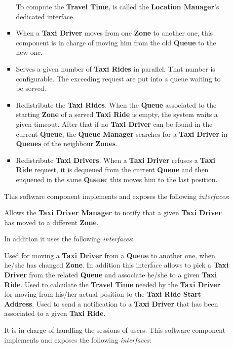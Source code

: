 \begin{itemize}
\begin{itemize}
\begin{itemize}
			To compute the \textbf{Travel Time}, is called the \textbf{Location Manager}'s dedicated interface.
			\item When a \textbf{Taxi Driver} moves from one \textbf{Zone} to another one, this component is in charge of moving him from the old \textbf{Queue} to the new one.
			\item Serves a given number of \textbf{Taxi Rides} in parallel. That number is configurable. The exceeding request are put into a queue waiting to be served.
			\item Redistribute the \textbf{Taxi Rides}. When the \textbf{Queue} associated to the starting \textbf{Zone} of a served \textbf{Taxi Ride} is empty, the system waits a given timeout. After that if no \textbf{Taxi Driver} can be found in the current \textbf{Queue}, the \textbf{Queue Manager} searches for a \textbf{Taxi Driver} in \textbf{Queues} of the neighbour \textbf{Zones}.
			\item Redistribute \textbf{Taxi Drivers}. When a \textbf{Taxi Driver} refuses a \textbf{Taxi Ride} request, it is dequeued from the current \textbf{Queue} and then enqueued in the same \textbf{Queue}: this moves him to the last position.
		\end{itemize}
		This software component implements and exposes the following \textit{interfaces}:
		\begin{itemize}
			 Allows the \textbf{Taxi Driver Manager} to notify that a given \textbf{Taxi Driver} has moved to a different \textbf{Zone}.
		\end{itemize}
		In addition it uses the following \textit{interfaces}:
		\begin{itemize}
			 Used for moving a \textbf{Taxi Driver} from a \textbf{Queue} to another one, when he/she has changed \textbf{Zone}.
			In addition this interface allows to pick a \textbf{Taxi Driver} from the related \textbf{Queue} and associate he/she to a given \textbf{Taxi Ride}.
			 Used to calculate the \textbf{Travel Time} needed by the \textbf{Taxi Driver} for moving from his/her actual position to the \textbf{Taxi Ride Start Address}.
				Used to send a notification to a \textbf{Taxi Driver} that has been associated to a given \textbf{Taxi Ride}.
		\end{itemize}
		\itemBold{Session Manager}
		It is in charge of handling the sessions of \myTaxiService{} users.
		This software component implements and exposes the following \textit{interfaces}:

\end{itemize}
\end{itemize}
